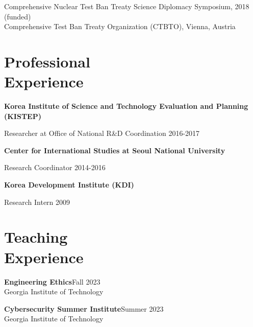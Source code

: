 \documentclass[margin,line, 10pt]{res}
\begin{document}
\begin{resume}
Comprehensive Nuclear Test Ban Treaty Science Diplomacy Symposium, 2018 (funded)\\
Comprehensive Test Ban Treaty Organization (CTBTO), Vienna, Austria\\



\section{\sc Professional\\ Experience}
\textbf{Korea Institute of Science and Technology Evaluation and Planning (KISTEP)}

\vspace{-0.4cm}
Researcher at Office of National R\&D Coordination \hfill {2016-2017 }

\textbf{Center for International Studies at Seoul National University}

\vspace{-0.4cm}
Research Coordinator \hfill {2014-2016}

{\bf Korea Development Institute (KDI)}

\vspace{-0.4cm}
Research Intern \hfill {2009}\\

\section{\sc Teaching\\ Experience}
{\bf Engineering Ethics}\hfill{Fall 2023}\\
Georgia Institute of Technology\\
\vspace{-0.4cm}

{\bf Cybersecurity Summer Institute}\hfill{Summer 2023}\\
Georgia Institute of Technology \\
\vspace{-0.4cm}




\end{resume}
\end{document}
